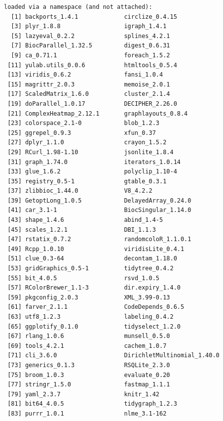 \documentclass[
]{book}
\begin{document}
\begin{verbatim}
loaded via a namespace (and not attached):
  [1] backports_1.4.1             circlize_0.4.15            
  [3] plyr_1.8.8                  igraph_1.4.1               
  [5] lazyeval_0.2.2              splines_4.2.1              
  [7] BiocParallel_1.32.5         digest_0.6.31              
  [9] ca_0.71.1                   foreach_1.5.2              
 [11] yulab.utils_0.0.6           htmltools_0.5.4            
 [13] viridis_0.6.2               fansi_1.0.4                
 [15] magrittr_2.0.3              memoise_2.0.1              
 [17] ScaledMatrix_1.6.0          cluster_2.1.4              
 [19] doParallel_1.0.17           DECIPHER_2.26.0            
 [21] ComplexHeatmap_2.12.1       graphlayouts_0.8.4         
 [23] colorspace_2.1-0            blob_1.2.3                 
 [25] ggrepel_0.9.3               xfun_0.37                  
 [27] dplyr_1.1.0                 crayon_1.5.2               
 [29] RCurl_1.98-1.10             jsonlite_1.8.4             
 [31] graph_1.74.0                iterators_1.0.14           
 [33] glue_1.6.2                  polyclip_1.10-4            
 [35] registry_0.5-1              gtable_0.3.1               
 [37] zlibbioc_1.44.0             V8_4.2.2                   
 [39] GetoptLong_1.0.5            DelayedArray_0.24.0        
 [41] car_3.1-1                   BiocSingular_1.14.0        
 [43] shape_1.4.6                 abind_1.4-5                
 [45] scales_1.2.1                DBI_1.1.3                  
 [47] rstatix_0.7.2               randomcoloR_1.1.0.1        
 [49] Rcpp_1.0.10                 viridisLite_0.4.1          
 [51] clue_0.3-64                 decontam_1.18.0            
 [53] gridGraphics_0.5-1          tidytree_0.4.2             
 [55] bit_4.0.5                   rsvd_1.0.5                 
 [57] RColorBrewer_1.1-3          dir.expiry_1.4.0           
 [59] pkgconfig_2.0.3             XML_3.99-0.13              
 [61] farver_2.1.1                CodeDepends_0.6.5          
 [63] utf8_1.2.3                  labeling_0.4.2             
 [65] ggplotify_0.1.0             tidyselect_1.2.0           
 [67] rlang_1.0.6                 munsell_0.5.0              
 [69] tools_4.2.1                 cachem_1.0.7               
 [71] cli_3.6.0                   DirichletMultinomial_1.40.0
 [73] generics_0.1.3              RSQLite_2.3.0              
 [75] broom_1.0.3                 evaluate_0.20              
 [77] stringr_1.5.0               fastmap_1.1.1              
 [79] yaml_2.3.7                  knitr_1.42                 
 [81] bit64_4.0.5                 tidygraph_1.2.3            
 [83] purrr_1.0.1                 nlme_3.1-162               

\end{verbatim}
\end{document}
